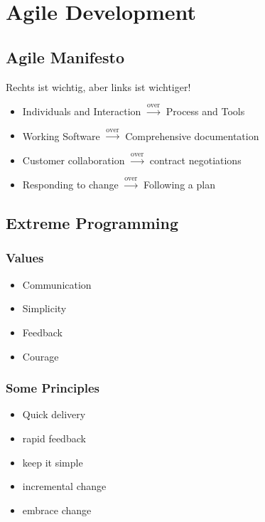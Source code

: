 \chapter{Agile Development}

\section{Agile Manifesto}

Rechts ist wichtig, aber links ist wichtiger!
\begin{itemize}
    \item Individuals and Interaction $\xrightarrow{\text{over}}$ Process and Tools
    \item Working Software $\xrightarrow{\text{over}}$ Comprehensive documentation
    \item Customer collaboration $\xrightarrow{\text{over}}$ contract negotiations
    \item Responding to change $\xrightarrow{\text{over}}$ Following a plan
\end{itemize}

\section{Extreme Programming}

\subsection{Values}
\begin{itemize}
    \item Communication
    \item Simplicity
    \item Feedback
    \item Courage
\end{itemize}
\subsection{Some Principles}
\begin{itemize}
    \item Quick delivery
    \item rapid feedback
    \item keep it simple
    \item incremental change
    \item embrace change
\end{itemize}
